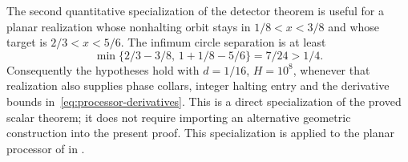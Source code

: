 The second quantitative specialization of the detector theorem is
useful for a planar realization whose nonhalting orbit stays in
$1/8<x<3/8$ and whose target is $2/3<x<5/6$.
The infimum circle separation is at least
\[
 \min\{2/3-3/8,\,1+1/8-5/6\}=7/24>1/4.
\]
Consequently the hypotheses hold with $d=1/16$, $H=10^8$, whenever
that realization also supplies phase collars, integer halting entry
and the derivative bounds in~\eqref{eq:processor-derivatives}.
This is a direct specialization of the proved scalar theorem; it
does not require importing an alternative geometric construction
into the present proof.
This specialization is applied to the planar processor of
\cite[Lemma~7.2]{slowclocks2026} in
\cite[Section~7.5]{slowclocks2026}.
